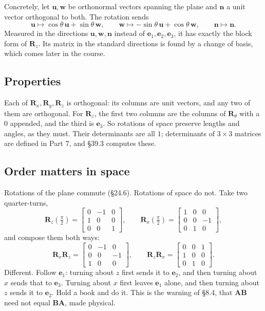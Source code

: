 \documentclass[11pt]{article}
\theoremstyle{plain}
\theoremstyle{definition}
\theoremstyle{remark}
\newcommand{\vc}[1]{\mathbf{#1}}
\newcommand{\mt}[1]{\mathbf{#1}}
\begin{document}
\noindent Concretely, let $\vc{u},\vc{w}$ be orthonormal vectors spanning the
plane and $\vc{n}$ a unit vector orthogonal to both. The rotation sends
\[
  \vc{u}\mapsto\cos\theta\,\vc{u}+\sin\theta\,\vc{w},\qquad
  \vc{w}\mapsto-\sin\theta\,\vc{u}+\cos\theta\,\vc{w},\qquad
  \vc{n}\mapsto\vc{n}.
\]
Measured in the directions $\vc{u},\vc{w},\vc{n}$ instead of
$\vc{e}_1,\vc{e}_2,\vc{e}_3$, it has exactly the block form of $\mt{R}_z$. Its
matrix in the standard directions is found by a change of basis, which comes
later in the course.

\subsection{Properties}
Each of $\mt{R}_x,\mt{R}_y,\mt{R}_z$ is orthogonal: its columns are unit
vectors, and any two of them are orthogonal. For $\mt{R}_z$, the first two
columns are the columns of $\mt{R}_\theta$ with a $0$ appended, and the third is
$\vc{e}_3$. So rotations of space preserve lengths and angles, as they must.
Their determinants are all $1$; determinants of $3\times3$ matrices are defined
in Part 7, and \S39.3 computes these.

\subsection{Order matters in space}
Rotations of the plane commute (\S24.6). Rotations of space do not. Take two
quarter-turns,
\[
  \mt{R}_z\!\left(\tfrac{\pi}{2}\right)=\begin{bmatrix}0&-1&0\\1&0&0\\0&0&1\end{bmatrix},
  \qquad
  \mt{R}_x\!\left(\tfrac{\pi}{2}\right)=\begin{bmatrix}1&0&0\\0&0&-1\\0&1&0\end{bmatrix},
\]
and compose them both ways:
\[
  \mt{R}_x\mt{R}_z=\begin{bmatrix}0&-1&0\\0&0&-1\\1&0&0\end{bmatrix},
  \qquad
  \mt{R}_z\mt{R}_x=\begin{bmatrix}0&0&1\\1&0&0\\0&1&0\end{bmatrix}.
\]
Different. Follow $\vc{e}_1$: turning about $z$ first sends it to $\vc{e}_2$,
and then turning about $x$ sends that to $\vc{e}_3$. Turning about $x$ first
leaves $\vc{e}_1$ alone, and then turning about $z$ sends it to $\vc{e}_2$.
Hold a book and do it. This is the warning of \S8.4, that $\mt{A}\mt{B}$ need
not equal $\mt{B}\mt{A}$, made physical.
\end{document}
